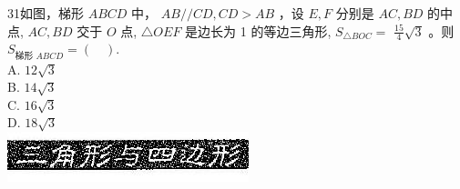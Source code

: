 \documentclass[10pt]{article}
\begin{document}
31如图，梯形 $A B C D$ 中， $A B / / C D, C D>A B$ ，设 $E, F$ 分别是 $A C, B D$ 的中点, $A C, B D$ 交于 $O$ 点, $\triangle O E F$ 是边长为 1 的等边三角形, $S_{\triangle B O C}=$ $\frac{15}{4} \sqrt{3}$ 。则 $S_{\text {梯形 } A B C D}=(\quad)$.\\
A. $12 \sqrt{3}$\\
B. $14 \sqrt{3}$\\
C. $16 \sqrt{3}$\\
D. $18 \sqrt{3}$\\
\includegraphics[max width=\textwidth, center]{2024_10_30_2c8f45efd4a519b08e1ag-144(2)}
\end{document}
